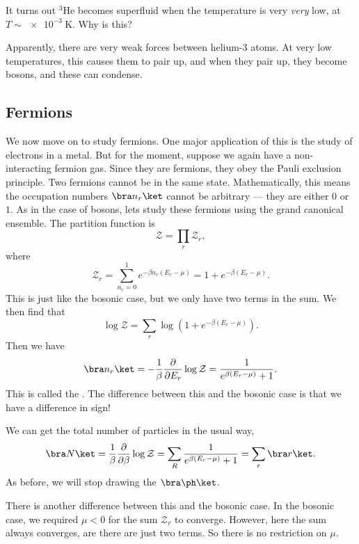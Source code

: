 \documentclass[a4paper]{article}
\begin{document}
It turns out $^3$He becomes superfluid when the temperature is very \emph{very} low, at $T \sim \SI{e-3}{\kelvin}$. Why is this?

Apparently, there are very weak forces between helium-3 atoms. At very low temperatures, this causes them to pair up, and when they pair up, they become bosons, and these can condense.

\subsection{Fermions}
We now move on to study fermions. One major application of this is the study of electrons in a metal. But for the moment, suppose we again have a non-interacting fermion gas. Since they are fermions, they obey the Pauli exclusion principle. Two fermions cannot be in the same state. Mathematically, this means the occupation numbers $\bra n_r\ket$ cannot be arbitrary --- they are either $0$ or $1$. As in the case of bosons, lets study these fermions using the grand canonical ensemble. The partition function is
\[
  \mathcal{Z} = \prod_r \mathcal{Z}_r,
\]
where
\[
  \mathcal{Z}_r = \sum_{n_r = 0}^1 e^{-\beta n_r (E_r - \mu)} = 1 + e^{-\beta (E_r - \mu)}.
\]
This is just like the bosonic case, but we only have two terms in the sum. We then find that
\[
  \log \mathcal{Z} = \sum_r \log (1 + e^{-\beta (E_r - \mu)}).
\]
Then we have
\[
  \bra n_r\ket = -\frac{1}{\beta} \frac{\partial}{\partial E_r} \log \mathcal{Z} = \frac{1}{e^{\beta(E_r - \mu)} + 1}.
\]
This is called the . The difference between this and the bosonic case is that we have a difference in sign!

We can get the total number of particles in the usual way,
\[
  \bra N\ket = \frac{1}{\beta} \frac{\partial}{\partial \beta}\log \mathcal{Z} = \sum_R \frac{1}{e^{\beta(E_r - \mu)} + 1} = \sum_r \bra r\ket.
\]
As before, we will stop drawing the $\bra \ph\ket$.

There is another difference between this and the bosonic case. In the bosonic case, we required $\mu < 0$ for the sum $\mathcal{Z}_r$ to converge. However, here the sum always converges, are there are just two terms. So there is no restriction on $\mu$.
\end{document}

